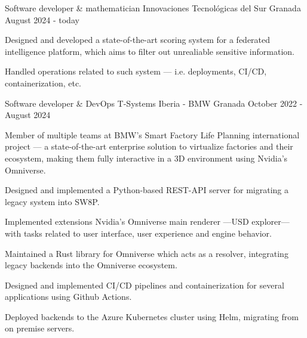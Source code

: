 
\begin{cventries}
	\cventry
		{Software developer \& mathematician}
		{Innovaciones Tecnológicas del Sur}
		{Granada}
		{August 2024 - today}
		{
			\begin{cvitems}
		\item {Designed and developed a state-of-the-art scoring system for a federated intelligence platform, which aims to filter out unrealiable sensitive information.}
		\item {Handled operations related to such system — i.e. deployments, CI/CD, containerization, etc.}
			\end{cvitems}
		}
	\cventry
		{Software developer \& DevOps} %
		{T-Systems Iberia - BMW} %
		{Granada} %
		{October 2022 - August 2024} %
		{
				\begin{cvitems} %
						\item {Member of multiple teams at BMW's Smart Factory Life Planning international project — a state-of-the-art enterprise solution to virtualize factories and their ecosystem, making them fully interactive in a 3D environment using Nvidia's Omniverse.}
						\item {Designed and implemented a Python-based REST-API server for migrating a legacy system into SW8P.}
						\item {Implemented extensions Nvidia's Omniverse main renderer —USD explorer— with tasks related to user interface, user experience and engine behavior.}
						\item {Maintained a Rust library for Omniverse which acts as a resolver, integrating legacy backends into the Omniverse ecosystem.}
						\item {Designed and implemented CI/CD pipelines and containerization for several applications using Github Actions.}
						\item {Deployed backends to the Azure Kubernetes cluster using Helm, migrating from on premise servers.}
				\end{cvitems}
		}
\end{cventries}
